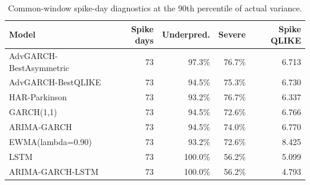 \begin{table}[!t]
\centering
\caption{Common-window spike-day diagnostics at the 90th percentile of actual variance.}
\label{tab:common-window-spike-diagnostics}
\scriptsize
\begin{tabular}{@{}L{0.24\textwidth}rrrr@{}}
\toprule
Model & Spike days & Underpred. & Severe & Spike QLIKE \\
\midrule
AdvGARCH-BestAsymmetric & 73 & 97.3\% & 76.7\% & 6.713 \\
AdvGARCH-BestQLIKE & 73 & 94.5\% & 75.3\% & 6.730 \\
HAR-Parkinson & 73 & 93.2\% & 76.7\% & 6.337 \\
GARCH(1,1) & 73 & 94.5\% & 72.6\% & 6.766 \\
ARIMA-GARCH & 73 & 94.5\% & 74.0\% & 6.770 \\
EWMA(lambda=0.90) & 73 & 93.2\% & 72.6\% & 8.425 \\
LSTM & 73 & 100.0\% & 56.2\% & 5.099 \\
ARIMA-GARCH-LSTM & 73 & 100.0\% & 56.2\% & 4.793 \\
\bottomrule
\end{tabular}
\end{table}
